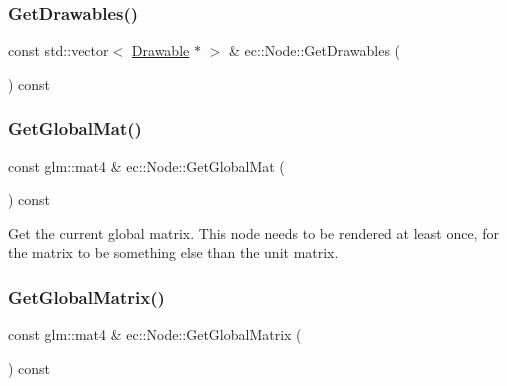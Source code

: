 \mbox{\label{classec_1_1_node_ab1cd50204e1b38c9c1b31e46d13ea915}} 
\subsubsection{\texorpdfstring{Get\+Drawables()}{GetDrawables()}}
{\footnotesize\ttfamily const std\+::vector$<$ \mbox{\hyperlink{classec_1_1_drawable}{Drawable}} $\ast$ $>$ \& ec\+::\+Node\+::\+Get\+Drawables (\begin{DoxyParamCaption}{ }\end{DoxyParamCaption}) const\hspace{0.3cm}{\ttfamily [virtual]}}

\mbox{\label{classec_1_1_node_aafbc9c31eb710b1ac22834792e039435}} 
\subsubsection{\texorpdfstring{Get\+Global\+Mat()}{GetGlobalMat()}}
{\footnotesize\ttfamily const glm\+::mat4 \& ec\+::\+Node\+::\+Get\+Global\+Mat (\begin{DoxyParamCaption}{ }\end{DoxyParamCaption}) const}

Get the current global matrix. This node needs to be rendered at least once, for the matrix to be something else than the unit matrix. \mbox{\label{classec_1_1_node_a65650fa6bb55597cc2436949e95321ca}} 
\subsubsection{\texorpdfstring{Get\+Global\+Matrix()}{GetGlobalMatrix()}}
{\footnotesize\ttfamily const glm\+::mat4 \& ec\+::\+Node\+::\+Get\+Global\+Matrix (\begin{DoxyParamCaption}{ }\end{DoxyParamCaption}) const}

\mbox{\label{classec_1_1_node_a166d54a9128b6f4d552cf83d8f10856c}} 
